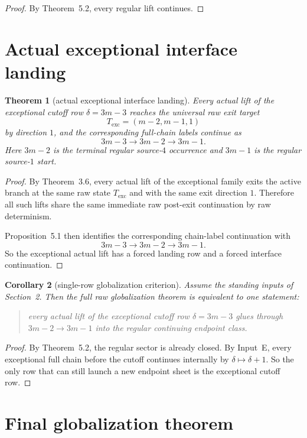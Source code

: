 \documentclass[11pt]{article}
\newtheorem{theorem}{Theorem}[section]
\newtheorem{corollary}[theorem]{Corollary}
\begin{document}
\begin{proof}
By Theorem~5.2, every regular lift continues.
\end{proof}

\section{Actual exceptional interface landing}

\begin{theorem}[actual exceptional interface landing]
Every actual lift of the exceptional cutoff row $\delta=3m-3$ reaches the
universal raw exit target
\[
T_{\mathrm{exc}}=(m-2,m-1,1)
\]
by direction $1$, and the corresponding full-chain labels continue as
\[
3m-3 \to 3m-2 \to 3m-1.
\]
Here $3m-2$ is the terminal regular source-$4$ occurrence and $3m-1$ is the
regular source-$1$ start.
\end{theorem}

\begin{proof}
By Theorem~3.6, every actual lift of the exceptional family exits the active
branch at the same raw state $T_{\mathrm{exc}}$ and with the same exit
direction $1$. Therefore all such lifts share the same immediate raw post-exit
continuation by raw determinism.

Proposition~5.1 then identifies the corresponding chain-label continuation with
\[
3m-3 \to 3m-2 \to 3m-1.
\]
So the exceptional actual lift has a forced landing row and a forced interface
continuation.
\end{proof}

\begin{corollary}[single-row globalization criterion]
Assume the standing inputs of Section~2. Then the full raw globalization
theorem is equivalent to one statement:
\begin{quote}
every actual lift of the exceptional cutoff row $\delta=3m-3$ glues through
$3m-2 \to 3m-1$ into the regular continuing endpoint class.
\end{quote}
\end{corollary}

\begin{proof}
By Theorem~5.2, the regular sector is already closed. By Input~E, every
exceptional full chain before the cutoff continues internally by
$\delta\mapsto \delta+1$. So the only row that can still launch a new endpoint
sheet is the exceptional cutoff row.
\end{proof}

\section{Final globalization theorem}
\end{document}
